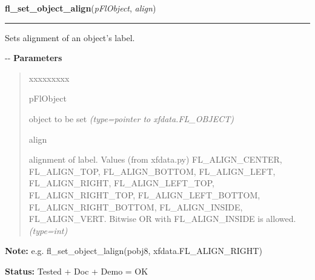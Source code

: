 \hspace{.8\funcindent}\begin{boxedminipage}{\funcwidth}

    \raggedright \textbf{fl\_set\_object\_align}(\textit{pFlObject}, \textit{align})

    \vspace{-1.5ex}

    \rule{\textwidth}{0.5\fboxrule}
\setlength{\parskip}{2ex}

Sets alignment of an object's label.

-{}-
\setlength{\parskip}{1ex}
      \textbf{Parameters}
      \vspace{-1ex}

      \begin{quote}
        \begin{Ventry}{xxxxxxxxx}

          \item[pFlObject]


object to be set
            {\it (type=pointer to xfdata.FL\_OBJECT)}

          \item[align]


alignment of label. Values (from xfdata.py) FL\_ALIGN\_CENTER,
FL\_ALIGN\_TOP, FL\_ALIGN\_BOTTOM, FL\_ALIGN\_LEFT, FL\_ALIGN\_RIGHT,
FL\_ALIGN\_LEFT\_TOP, FL\_ALIGN\_RIGHT\_TOP, FL\_ALIGN\_LEFT\_BOTTOM,
FL\_ALIGN\_RIGHT\_BOTTOM, FL\_ALIGN\_INSIDE, FL\_ALIGN\_VERT.
Bitwise OR with FL\_ALIGN\_INSIDE is allowed.
            {\it (type=int)}

        \end{Ventry}

      \end{quote}

\textbf{Note:} 
e.g. fl\_set\_object\_lalign(pobj8, xfdata.FL\_ALIGN\_RIGHT)


\textbf{Status:} 
Tested + Doc + Demo = OK


    \end{boxedminipage}

    \label{xformslib:flbasic:fl_set_object_shortcut}

    \vspace{0.5ex}

